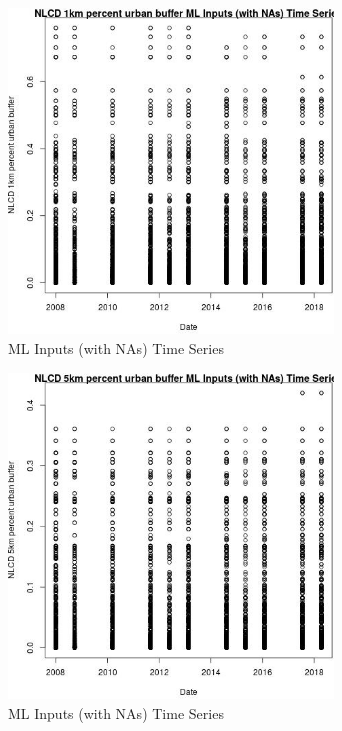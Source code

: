 \begin{figure} 
\centering  
\includegraphics[width=0.77\textwidth]{Code_Outputs/Report_ML_input_PM25_Step4_part_e_de_duplicated_aves_compiled_2019-05-18wNAs_NLCD_1km_percent_urban_buffervDate.jpg} 
\caption{\label{fig:Report_ML_input_PM25_Step4_part_e_de_duplicated_aves_compiled_2019-05-18wNAsNLCD_1km_percent_urban_buffervDate}ML Inputs (with NAs) Time Series} 
\end{figure} 
 

\begin{figure} 
\centering  
\includegraphics[width=0.77\textwidth]{Code_Outputs/Report_ML_input_PM25_Step4_part_e_de_duplicated_aves_compiled_2019-05-18wNAs_NLCD_5km_percent_urban_buffervDate.jpg} 
\caption{\label{fig:Report_ML_input_PM25_Step4_part_e_de_duplicated_aves_compiled_2019-05-18wNAsNLCD_5km_percent_urban_buffervDate}ML Inputs (with NAs) Time Series} 
\end{figure} 
 

